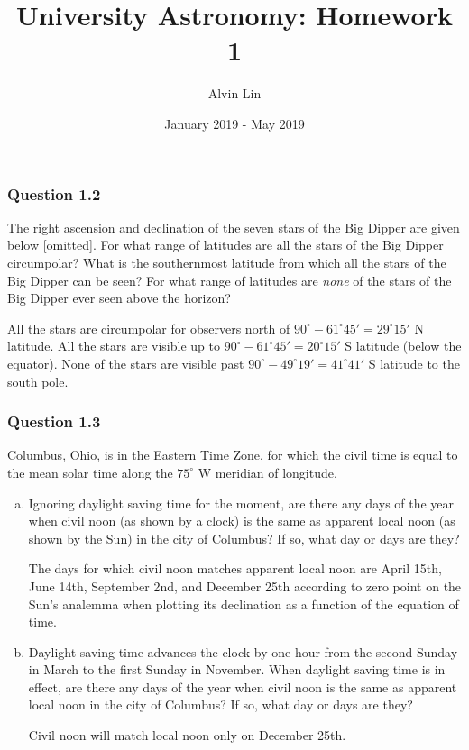 \documentclass{math}
\title{University Astronomy: Homework 1}
\author{Alvin Lin}
\date{January 2019 - May 2019}
\begin{document}
\maketitle

\subsubsection*{Question 1.2}
The right ascension and declination of the seven stars of the Big Dipper are
given below [omitted]. For what range of latitudes are all the stars of the Big
Dipper circumpolar? What is the southernmost latitude from which all the stars
of the Big Dipper can be seen? For what range of latitudes are \textit{none} of
the stars of the Big Dipper ever seen above the horizon? \par
All the stars are circumpolar for observers north of \( 90^{\circ}-
61^{\circ}45' = 29^{\circ}15' \) N latitude. All the stars are visible up to
\( 90^{\circ}-61^{\circ}45' = 20^{\circ}15' \) S latitude (below the
equator). None of the stars are visible past \( 90^{\circ}-49^{\circ}19' =
41^{\circ}41' \) S latitude to the south pole.

\subsubsection*{Question 1.3}
Columbus, Ohio, is in the Eastern Time Zone, for which the civil time is equal
to the mean solar time along the \( 75^{\circ} \) W meridian of longitude.
\begin{enumerate}[(a)]
  \item Ignoring daylight saving time for the moment, are there any days of the
    year when civil noon (as shown by a clock) is the same as apparent local
    noon (as shown by the Sun) in the city of Columbus? If so, what day or days
    are they? \par
    The days for which civil noon matches apparent local noon are April 15th,
    June 14th, September 2nd, and December 25th according to zero point on the
    Sun's analemma when plotting its declination as a function of the equation
    of time.
  \item Daylight saving time advances the clock by one hour from the second
    Sunday in March to the first Sunday in November. When daylight saving time
    is in effect, are there any days of the year when civil noon is the same as
    apparent local noon in the city of Columbus? If so, what day or days are
    they? \par
    Civil noon will match local noon only on December 25th.
\end{enumerate}
\end{document}
